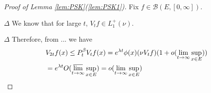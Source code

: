\documentclass[12pt,a4paper]{amsart}
\numberwithin{equation}{section}
\theoremstyle{plain}
\theoremstyle{definition}
\begin{document}
  \begin{proof}[Proof of Lemma \ref{lem:PSK}(\ref{lem:PSK1})]
    Fix $f\in \mathcal B(E,[0,\infty])$.

    $\Delta$ We know that for large $t$, $V_tf \in L_1^+(\nu)$.

    $\Delta$ Therefore, from ... we have
    \begin{align}
      & V_{2t}f (x)\leq P_t^\beta V_tf(x) = e^{\lambda t}\phi(x) (\nu V_tf) (1+o(\lim_{t\to \infty} \sup_{x\in E})) 
      \\ &  =e^{\lambda t} O(\varlimsup_{t\to \infty}\sup_{x\in E})
           = o(\lim_{t\to \infty}\sup_{x\in E})
        \qedhere
    \end{align}
  \end{proof}

  
\end{document}
